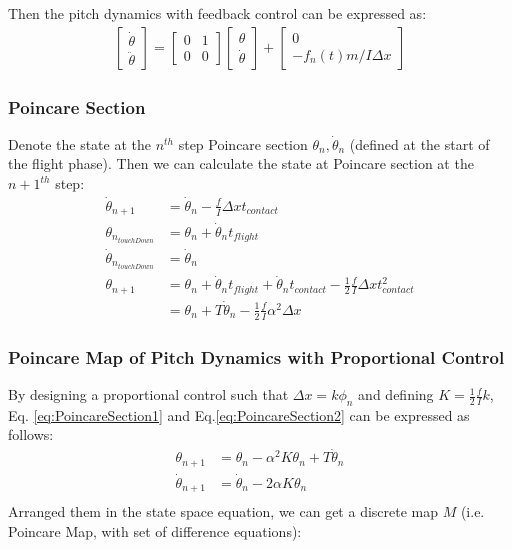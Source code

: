 Then the pitch dynamics with feedback control can be expressed as:
\begin{align}
\begin{bmatrix}
\dot \theta  \\
\ddot \theta
\end{bmatrix} = \begin{bmatrix}
0 & 1 \\
0 & 0
\end{bmatrix}\begin{bmatrix}
 \theta  \\
\dot \theta
\end{bmatrix} + 
\begin{bmatrix}
0  \\
-f_n(t)m/I\Delta x
\end{bmatrix}
\end{align}
\subsubsection{Poincare Section}
\noindent Denote the state at the $n^{th}$ step Poincare section $\theta_n, \dot \theta_n$ (defined at the start of the flight phase). Then we can calculate the state at Poincare section at the $n+1^{th}$ step:
\begin{align}
\label{eq:PoincareSection1}
\dot \theta_{n+1} &= \dot \theta_{n} - \frac{f}{I}\Delta x t_{contact} \\
\nonumber\theta_{n_{touchDown}} &= \theta_{n} + \dot \theta_{n}t_{flight}\\
\nonumber\dot \theta_{n_{touchDown}} &= \dot \theta_{n}\\
\nonumber\theta_{n+1} &= \theta_{n} + \dot \theta_{n}t_{flight} + \dot \theta_{n}t_{contact} - \frac{1}{2}\frac{f}{I}\Delta xt^2_{contact}\\
\label{eq:PoincareSection2} & = \theta_n + T\dot \theta_n - \frac{1}{2}\frac{f}{I}\alpha^2\Delta x
\end{align}


\subsubsection{Poincare Map of Pitch Dynamics with Proportional Control}
By designing a proportional control such that $\Delta x = k\phi_n$ and defining $K =\frac{1}{2} \frac{f}{I}k$, Eq. \ref{eq:PoincareSection1} and Eq.\ref{eq:PoincareSection2} can be expressed as follows:
\begin{align*}
\theta_{n+1} &= \theta_n  - \alpha^2 K \theta_n + T\dot \theta_n\\
\dot \theta_{n+1} &= \dot \theta_n  - 2\alpha K \theta_n\\
\end{align*}
Arranged them in the state space equation, we can get a discrete map $M$ (i.e. Poincare Map, with set of difference equations):

